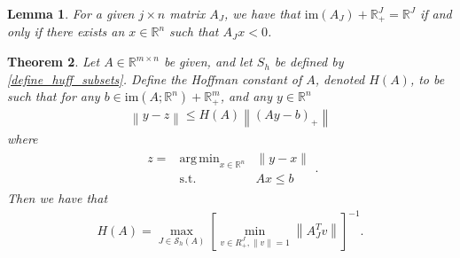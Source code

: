 \documentclass{article}
\newtheorem{theorem}{Theorem}[section]
\newtheorem{lemma}[theorem]{Lemma}
\theoremstyle{case}
\numberwithin{theorem}{subsection}
\DeclareMathOperator*{\argmin}{arg\,min}
\newcommand{\reals}{\mathbb R}
\newcommand{\Rn}{\mathbb R^n}
\newcommand{\image}{{\textrm{im}}}
\begin{document}
\begin{lemma}
For a given $j \times n$ matrix $A_J$, we have that 
$\image(A_J) + \reals_+^J = \reals^J$
if and only if there exists an $x \in \Rn$ such that
$A_J x < 0$.
\end{lemma}


\begin{theorem}
\label{hoffman_theorem}
Let $A \in \mathbb R^{m \times n}$ be given, and let $S_h$ be defined by \cref{define_huff_subsets}.
Define the Hoffman constant of $A$, denoted $H(A)$, to be such that for any 
$b \in \image(A; \Rn) + \reals^m_+$, and any $y \in \Rn$
\begin{align*}
\left\|y - z\right\| \le H(A) \left\|\left(Ay - b\right)_+\right\|
\end{align*}
where
\begin{align*}
\begin{array}{ccc}
z = & \argmin_{x \in \Rn} & \|y - x\| \\
      & \textrm{s.t.}    & Ax \le b
\end{array}.
\end{align*}
Then we have that
\begin{align*}
H(A) = \max_{J \in \mathcal S_h(A)} \left[\min_{v \in R^J_+, \|v\| = 1}  \left\|A_J^Tv\right\| \right]^{-1}.
\end{align*}
\end{theorem}
\end{document}
